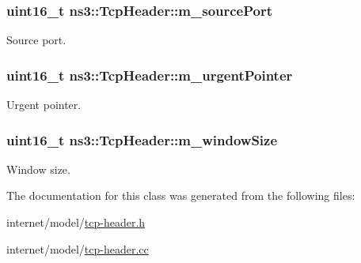 \subsubsection[{\texorpdfstring{m\+\_\+source\+Port}{m_sourcePort}}]{\setlength{\rightskip}{0pt plus 5cm}uint16\+\_\+t ns3\+::\+Tcp\+Header\+::m\+\_\+source\+Port\hspace{0.3cm}{\ttfamily [private]}}\hypertarget{classns3_1_1TcpHeader_a44bcf51982e1c0bd0c8fd205a28c3927}{}\label{classns3_1_1TcpHeader_a44bcf51982e1c0bd0c8fd205a28c3927}


Source port. 

\subsubsection[{\texorpdfstring{m\+\_\+urgent\+Pointer}{m_urgentPointer}}]{\setlength{\rightskip}{0pt plus 5cm}uint16\+\_\+t ns3\+::\+Tcp\+Header\+::m\+\_\+urgent\+Pointer\hspace{0.3cm}{\ttfamily [private]}}\hypertarget{classns3_1_1TcpHeader_a06c558a3586f9756e6a18165dee3399d}{}\label{classns3_1_1TcpHeader_a06c558a3586f9756e6a18165dee3399d}


Urgent pointer. 

\subsubsection[{\texorpdfstring{m\+\_\+window\+Size}{m_windowSize}}]{\setlength{\rightskip}{0pt plus 5cm}uint16\+\_\+t ns3\+::\+Tcp\+Header\+::m\+\_\+window\+Size\hspace{0.3cm}{\ttfamily [private]}}\hypertarget{classns3_1_1TcpHeader_abbf7aca8f5e3e796525b4b423b4dbf39}{}\label{classns3_1_1TcpHeader_abbf7aca8f5e3e796525b4b423b4dbf39}


Window size. 



The documentation for this class was generated from the following files\+:\begin{DoxyCompactItemize}
\item 
internet/model/\hyperlink{tcp-header_8h}{tcp-\/header.\+h}\item 
internet/model/\hyperlink{tcp-header_8cc}{tcp-\/header.\+cc}\end{DoxyCompactItemize}
